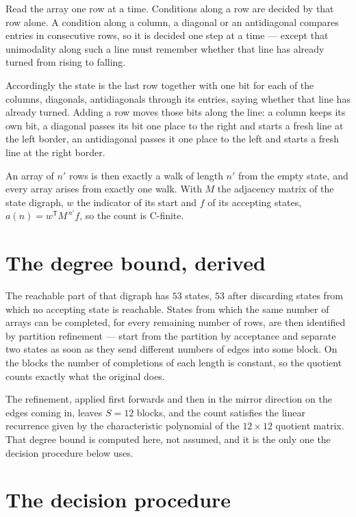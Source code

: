 \documentclass[11pt]{article}
\theoremstyle{definition}
\begin{document}
Read the array one row at a time. Conditions along a row are decided by that row alone. A condition along a column, a diagonal or an antidiagonal compares entries in consecutive rows, so it is decided one step at a time --- except that unimodality along such a line must remember whether that line has already turned from rising to falling.

Accordingly the state is the last row together with one bit for each of the columns, diagonals, antidiagonals through its entries, saying whether that line has already turned. Adding a row moves those bits along the line: a column keeps its own bit, a diagonal passes its bit one place to the right and starts a fresh line at the left border, an antidiagonal passes it one place to the left and starts a fresh line at the right border.

An array of $n'$ rows is then exactly a walk of length $n'$ from the empty state, and every array arises from exactly one walk. With $M$ the adjacency matrix of the state digraph, $w$ the indicator of its start and $f$ of its accepting states, $a(n) = w^{\mathsf T}M^{\,n'}f$, so the count is C-finite.

\section{The degree bound, derived}

The reachable part of that digraph has $53$ states, $53$ after discarding states from which no accepting state is reachable. States from which the same number of arrays can be completed, for every remaining number of rows, are then identified by partition refinement --- start from the partition by acceptance and separate two states as soon as they send different numbers of edges into some block. On the blocks the number of completions of each length is constant, so the quotient counts exactly what the original does.

The refinement, applied first forwards and then in the mirror direction on the edges coming in, leaves $S = 12$ blocks, and the count satisfies the linear recurrence given by the characteristic polynomial of the $12 \times 12$ quotient matrix. That degree bound is computed here, not assumed, and it is the only one the decision procedure below uses.

\section{The decision procedure}
\end{document}
